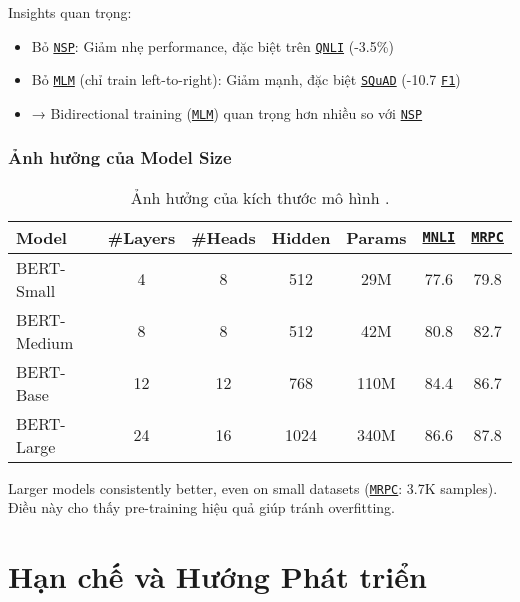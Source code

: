    Insights quan trọng:
    \begin{itemize}
        \item Bỏ \hyperref[acro:nsp]{\texttt{NSP}}: Giảm nhẹ performance, đặc biệt trên \hyperref[acro:qnli]{\texttt{QNLI}} (-3.5\%)
        \item Bỏ \hyperref[acro:mlm]{\texttt{MLM}} (chỉ train left-to-right): Giảm mạnh, đặc biệt \hyperref[acro:squad]{\texttt{SQuAD}} (-10.7 \hyperref[acro:f1]{\texttt{F1}})
        \item → Bidirectional training (\hyperref[acro:mlm]{\texttt{MLM}}) quan trọng hơn nhiều so với \hyperref[acro:nsp]{\texttt{NSP}}
    \end{itemize}
    
    \subsubsection{Ảnh hưởng của Model Size}
    \begin{table}[H]
        \centering
        \caption{Ảnh hưởng của kích thước mô hình \cite{devlin2018bert}.}
        \label{tab:model_size_effect}
        \begin{tabular}{lcccccc}
            \toprule
            \textbf{Model} & \textbf{\#Layers} & \textbf{\#Heads} & \textbf{Hidden} & \textbf{Params} & \textbf{\hyperref[acro:mnli]{\texttt{MNLI}}} & \textbf{\hyperref[acro:mrpc]{\texttt{MRPC}}} \\
            \midrule
            BERT-Small & 4 & 8 & 512 & 29M & 77.6 & 79.8 \\
            BERT-Medium & 8 & 8 & 512 & 42M & 80.8 & 82.7 \\
            BERT-Base & 12 & 12 & 768 & 110M & 84.4 & 86.7 \\
            BERT-Large & 24 & 16 & 1024 & 340M & 86.6 & 87.8 \\
            \bottomrule
        \end{tabular}
    \end{table}
    
    Larger models consistently better, even on small datasets (\hyperref[acro:mrpc]{\texttt{MRPC}}: 3.7K samples). Điều này cho thấy pre-training hiệu quả giúp tránh overfitting.
    
    \section{Hạn chế và Hướng Phát triển}
    \label{sec:han_che_huong_phat_trien}
    
